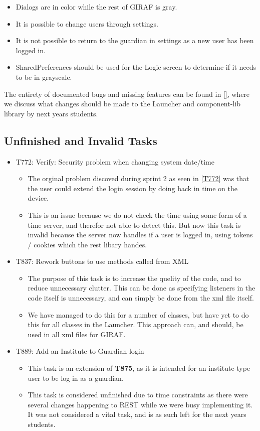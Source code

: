 \begin{itemize}
  \item Dialogs are in color while the rest of GIRAF is gray.
  \item It is possible to change users through settings.
  \item It is not possible to return to the guardian in settings as a new user
  has been logged in.
  \item SharedPreferences should be used for the Logic screen to determine if
  it needs to be in grayscale.
\end{itemize}

The entirety of documented bugs and missing features can be found in \autoref{},
where we discuss what changes should be made to the Launcher and component-lib
library by next years students.


\subsection{Unfinished and Invalid Tasks}\label{S4Invalid}
\begin{itemize}
  \item T772: Verify: Security problem when changing system date/time
  	\begin{itemize}
  		\item The orginal problem discoved during sprint 2 as seen in \autoref{T772}
 		was that the user could extend the login session by doing back in time on the
  		device.
		\item This is an issue because we do not check the time using some form of a
		time server, and therefor not able to detect this.  
		But now this task is invalid because the server now handles if a user is
		logged in, using tokens / cookies which the rest libary handes.
		\end{itemize}
  \item T837: Rework buttons to use methods called from XML
	\begin{itemize}
	  \item The purpose of this task is to increase the quelity of the code, and to
	  reduce unnecessary clutter. This can be done as specifying listeners in the
	  code itself is unnecessary, and can simply be done from the xml file itself.
	  \item We have managed to do this for a number of classes, but have yet to
	  do this for all classes in the Launcher. This approach can, and should, be
	  used in all xml files for GIRAF.
	  \end{itemize}
  \item T889: Add an Institute to Guardian login
   \begin{itemize}
     \item This task is an extension of \textbf{T875}, as it is intended for an
     institute-type user to be log in as a guardian. 
     \item This task is considered unfinished due to time constraints as there
     were several changes happening to REST while we were busy implementing it.
     It was not considered a vital task, and is as such left for the next years
     students.
   \end{itemize}
\end{itemize}